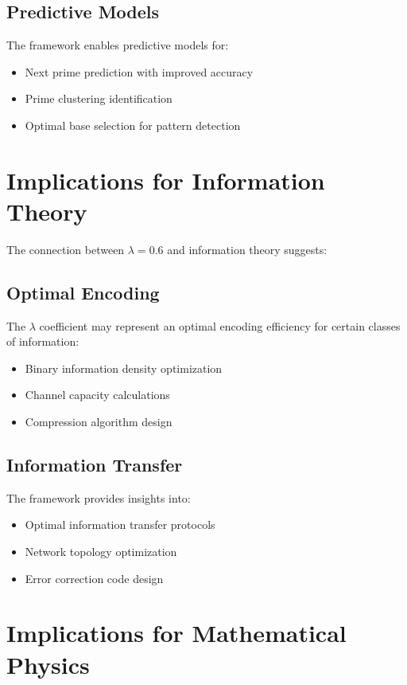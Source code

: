 \documentclass[12pt,a4paper]{report}
\begin{document}
\subsection{Predictive Models}

The framework enables predictive models for:
\begin{itemize}
\item Next prime prediction with improved accuracy
\item Prime clustering identification
\item Optimal base selection for pattern detection
\end{itemize}

\section{Implications for Information Theory}

The connection between $\lambda = 0.6$ and information theory suggests:

\subsection{Optimal Encoding}

The $\lambda$ coefficient may represent an optimal encoding efficiency for certain classes of information:
\begin{itemize}
\item Binary information density optimization
\item Channel capacity calculations
\item Compression algorithm design
\end{itemize}

\subsection{Information Transfer}

The framework provides insights into:
\begin{itemize}
\item Optimal information transfer protocols
\item Network topology optimization
\item Error correction code design
\end{itemize}

\section{Implications for Mathematical Physics}
\end{document}
